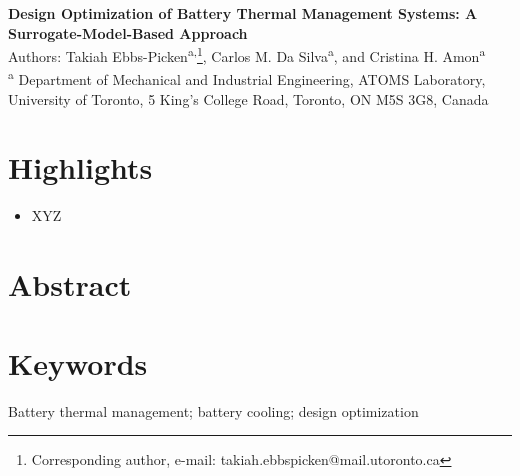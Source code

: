\documentclass[12pt]{article}
\date{\today}
\newenvironment{romanPagenumber}[1]
{\setcounter{page}{#1}\renewcommand{\thepage}{\roman{page}}}
{\pagenumbering{arabic}}
\begin{document}
\begin{titlepage}
	\centering
	\vfill
	\Huge{
		\textbf{Design Optimization of Battery Thermal Management Systems: A Surrogate-Model-Based Approach} 
	}
	\\ 
	\medskip
	\large{
		Authors: Takiah Ebbs-Picken\textsuperscript{a,}\footnote{Corresponding author, e-mail: takiah.ebbspicken@mail.utoronto.ca}, Carlos M. Da Silva\textsuperscript{a}, and Cristina H. Amon\textsuperscript{a}
	}
	\\
	\medskip
	\small{
		\textsuperscript{a} Department of Mechanical and Industrial Engineering, ATOMS Laboratory, University of Toronto, 5 King’s College Road, Toronto, ON M5S 3G8, Canada
		\\
		
	}
	\section*{Highlights}
	\begin{itemize}
		\item XYZ
	\end{itemize}
	
	\section*{Abstract}
	
	
	\section*{Keywords}
	Battery thermal management; battery cooling; design optimization
	\vfill
\end{titlepage}

\clearpage %

\begin{romanPagenumber}{2} %


\tableofcontents %
\clearpage
{}
\begin{scriptsize}
	\begin{multicols}{2}
	\end{multicols}
\end{scriptsize}

\clearpage
\end{romanPagenumber} %
\end{document}
